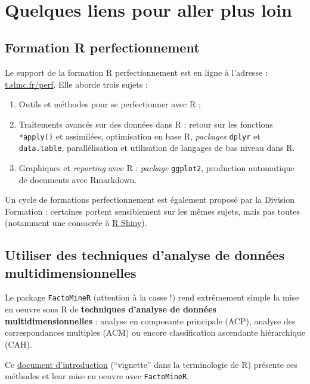 \documentclass[12pt,twosided, notitlepage]{book}
\begin{document}
~

\section{Quelques liens pour aller plus
loin}\label{quelques-liens-pour-aller-plus-loin}

\subsection{Formation R
perfectionnement}\label{formation-r-perfectionnement}

Le support de la formation R perfectionnement est en ligne à l'adresse :
\href{http://teaching.slmc.fr/perf}{t.slmc.fr/perf}. Elle aborde trois
sujets :

\begin{enumerate}
\def\labelenumi{\arabic{enumi}.}
\item
  Outils et méthodes pour se perfectionner avec R ;
\item
  Traitements avancés sur des données dans R : retour sur les fonctions
  \texttt{*apply()} et assimilées, optimisation en base R,
  \emph{packages} \texttt{dplyr} et \texttt{data.table}, parallélisation
  et utilisation de langages de bas niveau dans R.
\item
  Graphiques et \emph{reporting} avec R : \emph{package}
  \texttt{ggplot2}, production automatique de documents avec Rmarkdown.
\end{enumerate}

Un cycle de formations perfectionnement est également proposé par la
Division Formation : certaines portent sensiblement sur les mêmes
sujets, mais pas toutes (notamment une consacrée à
\href{https://shiny.rstudio.com/}{R Shiny}).

\subsection{Utiliser des techniques d'analyse de données
multidimensionnelles}\label{utiliser-des-techniques-danalyse-de-donnees-multidimensionnelles}

Le package \texttt{FactoMineR} (attention à la casse !) rend extrêmement
simple la mise en oeuvre sous R de \textbf{techniques d'analyse de
données multidimensionnelles} : analyse en composante principale (ACP),
analyse des correspondances multiples (ACM) ou encore classification
ascendante hiérarchique (CAH).

Ce
\href{https://cran.r-project.org/web/packages/FactoMineR/vignettes/FactoMineR.pdf}{document
d'introduction} (\enquote{vignette} dans la terminologie de R) présente
ces méthodes et leur mise en oeuvre avec \texttt{FactoMineR}.
\end{document}
